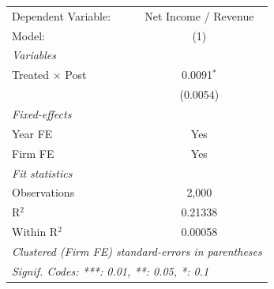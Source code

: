 
\begingroup
\centering
\begin{tabular}{lc}
   \tabularnewline \midrule \midrule
   Dependent Variable:    & Net Income / Revenue\\  
   Model:                 & (1)\\  
   \midrule
   \emph{Variables}\\
   Treated $\times$ Post  & 0.0091$^{*}$\\   
                          & (0.0054)\\   
   \midrule
   \emph{Fixed-effects}\\
   Year FE                & Yes\\  
   Firm FE                & Yes\\  
   \midrule
   \emph{Fit statistics}\\
   Observations           & 2,000\\  
   R$^2$                  & 0.21338\\  
   Within R$^2$           & 0.00058\\  
   \midrule \midrule
   \multicolumn{2}{l}{\emph{Clustered (Firm FE) standard-errors in parentheses}}\\
   \multicolumn{2}{l}{\emph{Signif. Codes: ***: 0.01, **: 0.05, *: 0.1}}\\
\end{tabular}
\par\endgroup


